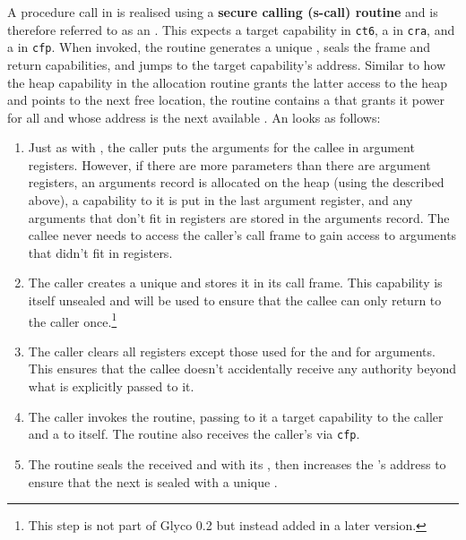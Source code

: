 \documentclass[main.tex]{subfiles}
\begin{document}
A procedure call in  is realised using a \textbf{secure calling (s-call) routine} and is therefore referred to as an \textbf{}. This  expects a target capability in \texttt{ct6}, a  in \texttt{cra}, and a  in \texttt{cfp}. When invoked, the routine generates a unique , seals the frame and return capabilities, and jumps to the target capability's address. Similar to how the heap capability in the allocation routine grants the latter access to the heap and points to the next free location, the  routine contains a  that grants it  power for all  and whose address is the next available . An  looks as follows:

\begin{enumerate}
	
	\item Just as with , the caller puts the arguments for the callee in argument registers. However, if there are more parameters than there are argument registers, an arguments record is allocated on the heap (using the  described above), a capability to it is put in the last argument register, and any arguments that don't fit in registers are stored in the arguments record. The callee never needs to access the caller's call frame to gain access to arguments that didn't fit in registers.
	
	\item \label{itm:retseal} The caller creates a unique  and stores it in its call frame. This capability is itself unsealed and will be used to ensure that the callee can only return to the caller once.\footnote{This step is not part of Glyco 0.2 but instead added in a later version.} %
	
	\item The caller clears all registers except those used for the  and for arguments. This ensures that the callee doesn't accidentally receive any authority beyond what is explicitly passed to it.
	
	\item The caller invokes the  routine, passing to it a target capability to the caller and a  to itself. The routine also receives the caller's  via \texttt{cfp}.
	
	\item The routine seals the received  and  with its , then increases the 's address to ensure that the next  is sealed with a unique .
	

\end{enumerate}
\end{document}
